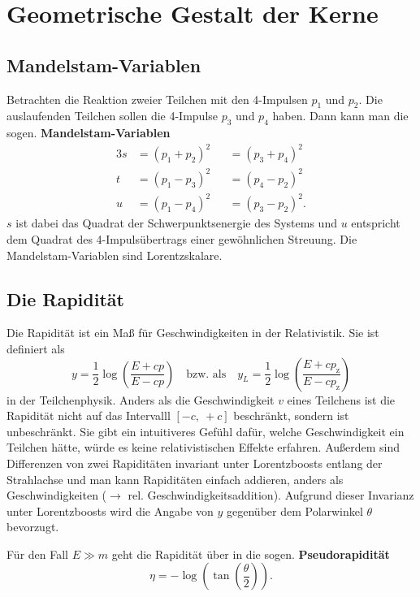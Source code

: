 \chapter{Geometrische Gestalt der Kerne}

\section{Mandelstam-Variablen}
Betrachten die Reaktion zweier Teilchen mit den 4-Impulsen $p_1$ und $p_2$. Die auslaufenden Teilchen sollen die 4-Impulse $p_3$ und $p_4$ haben.
Dann kann man die sogen. \textbf{Mandelstam-Variablen}
\begin{alignat*}{3}
	s &= \left(p_1 + p_2 \right)^2 &&= \left(p_3 + p_4 \right)^2 \\
	t &= \left(p_1 - p_3 \right)^2 &&= \left(p_4 - p_2 \right)^2 \\
	u &= \left(p_1 - p_4 \right)^2 &&= \left(p_3 - p_2 \right)^2.
\end{alignat*}
$s$ ist dabei das Quadrat der Schwerpunktsenergie des Systems und $u$ entspricht dem Quadrat des 4-Impulsübertrags einer gewöhnlichen Streuung.
Die Mandelstam-Variablen sind Lorentzskalare.

\section{Die Rapidität}
Die Rapidität ist ein Maß für Geschwindigkeiten in der Relativistik.
Sie ist definiert als
\begin{equation*}
	y = \frac{1}{2}\log\left(\frac{E+cp}{E-cp}\right)\quad \text{bzw. als}\quad y_L=\frac{1}{2}\log\left(\frac{E+cp_\text{z}}{E-cp_\text{z}}\right)
\end{equation*}
in der Teilchenphysik.
Anders als die Geschwindigkeit $v$ eines Teilchens ist die Rapidität nicht auf das Intervalll $[-c,\ +c]$ beschränkt, sondern ist unbeschränkt.
Sie gibt ein intuitiveres Gefühl dafür, welche Geschwindigkeit ein Teilchen hätte, würde es keine relativistischen Effekte erfahren.
Außerdem sind Differenzen von zwei Rapiditäten invariant unter Lorentzboosts entlang der Strahlachse und man kann Rapiditäten einfach addieren, anders als Geschwindigkeiten ($\rightarrow$ rel. Geschwindigkeitsaddition).
Aufgrund dieser Invarianz unter Lorentzboosts wird die Angabe von $y$ gegenüber dem Polarwinkel $\theta$ bevorzugt.

Für den Fall $E\gg m$ geht die Rapidität über in die sogen. \textbf{Pseudorapidität}
\begin{equation*}
	\eta = -\log\left(\tan\left(\frac{\theta}{2}\right)\right).
\end{equation*}

